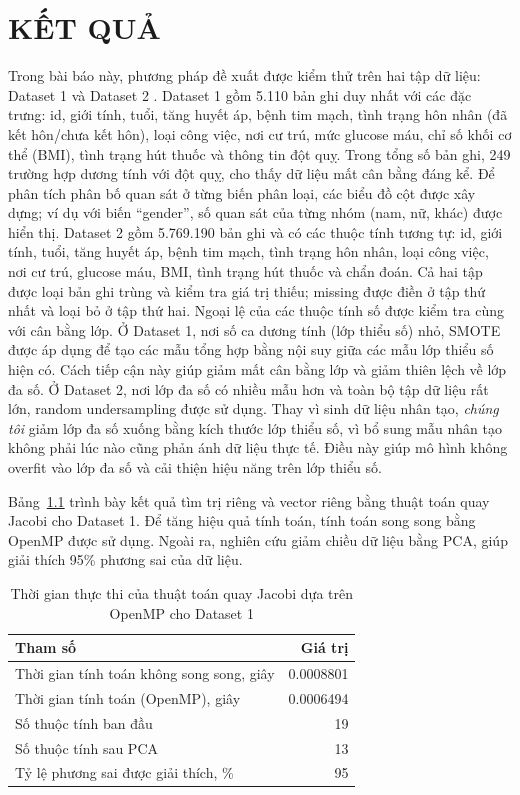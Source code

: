 \chapter{KẾT QUẢ}
Trong bài báo này, phương pháp đề xuất được kiểm thử trên hai tập dữ liệu: Dataset 1  và Dataset 2 . Dataset 1 gồm 5.110 bản ghi duy nhất với các đặc trưng: id, giới tính, tuổi, tăng huyết áp, bệnh tim mạch, tình trạng hôn nhân (đã kết hôn/chưa kết hôn), loại công việc, nơi cư trú, mức glucose máu, chỉ số khối cơ thể (BMI), tình trạng hút thuốc và thông tin đột quỵ. Trong tổng số bản ghi, 249 trường hợp dương tính với đột quỵ, cho thấy dữ liệu mất cân bằng đáng kể. Để phân tích phân bố quan sát ở từng biến phân loại, các biểu đồ cột được xây dựng; ví dụ với biến ``gender'', số quan sát của từng nhóm (nam, nữ, khác) được hiển thị. Dataset 2 gồm 5.769.190 bản ghi và có các thuộc tính tương tự: id, giới tính, tuổi, tăng huyết áp, bệnh tim mạch, tình trạng hôn nhân, loại công việc, nơi cư trú, glucose máu, BMI, tình trạng hút thuốc và chẩn đoán. Cả hai tập được loại bản ghi trùng và kiểm tra giá trị thiếu; missing được điền ở tập thứ nhất và loại bỏ ở tập thứ hai. Ngoại lệ của các thuộc tính số được kiểm tra cùng với cân bằng lớp. Ở Dataset 1, nơi số ca dương tính (lớp thiểu số) nhỏ, SMOTE được áp dụng để tạo các mẫu tổng hợp bằng nội suy giữa các mẫu lớp thiểu số hiện có. Cách tiếp cận này giúp giảm mất cân bằng lớp và giảm thiên lệch về lớp đa số. Ở Dataset 2, nơi lớp đa số có nhiều mẫu hơn và toàn bộ tập dữ liệu rất lớn, random undersampling được sử dụng. Thay vì sinh dữ liệu nhân tạo, \textit{chúng tôi} giảm lớp đa số xuống bằng kích thước lớp thiểu số, vì bổ sung mẫu nhân tạo không phải lúc nào cũng phản ánh dữ liệu thực tế. Điều này giúp mô hình không overfit vào lớp đa số và cải thiện hiệu năng trên lớp thiểu số.

Bảng~\ref{tab:jacobi1} trình bày kết quả tìm trị riêng và vector riêng bằng thuật toán quay Jacobi cho Dataset 1. Để tăng hiệu quả tính toán, tính toán song song bằng OpenMP được sử dụng. Ngoài ra, nghiên cứu giảm chiều dữ liệu bằng PCA, giúp giải thích 95\% phương sai của dữ liệu.

\begin{table}[H]
\centering
\caption{Thời gian thực thi của thuật toán quay Jacobi dựa trên OpenMP cho Dataset 1}\label{tab:jacobi1}
\begin{tabular}{lr}
\toprule
\textbf{Tham số} & \textbf{Giá trị}\\
\midrule
Thời gian tính toán không song song, giây & 0.0008801\\
Thời gian tính toán (OpenMP), giây & 0.0006494\\
Số thuộc tính ban đầu & 19\\
Số thuộc tính sau PCA & 13\\
Tỷ lệ phương sai được giải thích, \% & 95\\
\bottomrule
\end{tabular}
\end{table}

